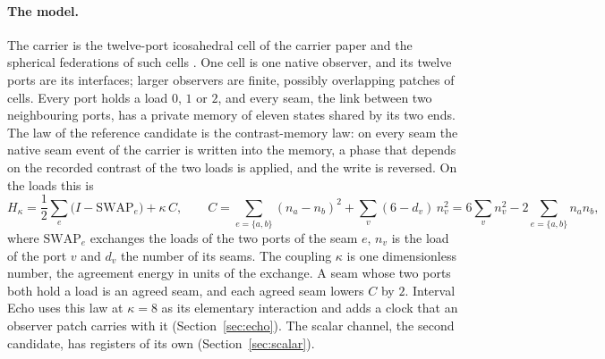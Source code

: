 \documentclass[11pt]{article}
\theoremstyle{definition}
\theoremstyle{remark}
\theoremstyle{plain}
\newcommand{\SWAP}{\mathrm{SWAP}}
\begin{document}
\paragraph{The model.}
The carrier is the twelve-port icosahedral cell of the carrier paper and
the spherical federations of such cells \cite{ophmicro}. One cell is one
native observer, and its twelve ports are its interfaces; larger observers
are finite, possibly overlapping patches of cells. Every port holds a load
$0$, $1$ or $2$, and every seam, the link between two neighbouring ports,
has a private memory of eleven states shared by its two ends. The law of
the reference candidate is the contrast-memory law: on every seam the
native seam event of the carrier is written into the memory, a phase that
depends on the recorded contrast of the two loads is applied, and the write
is reversed. On the loads this is
\begin{equation}
H_\kappa=\frac12\sum_{e}\bigl(I-\SWAP_e\bigr)+\kappa\,C,
\qquad
C=\sum_{e=\{a,b\}}(n_a-n_b)^2+\sum_v(6-d_v)\,n_v^2
 =6\sum_v n_v^2-2\sum_{e=\{a,b\}}n_an_b,
\label{eq:law}
\end{equation}
where $\SWAP_e$ exchanges the loads of the two ports of the seam $e$, $n_v$
is the load of the port $v$ and $d_v$ the number of its seams. The coupling
$\kappa$ is one dimensionless number, the agreement energy in units of the
exchange. A seam whose two ports both hold a load is an agreed seam, and
each agreed seam lowers $C$ by $2$. Interval Echo uses this law at
$\kappa=8$ as its elementary interaction and adds a clock that an observer
patch carries with it (Section~\ref{sec:echo}). The scalar channel, the
second candidate, has registers of its own (Section~\ref{sec:scalar}).
\end{document}
